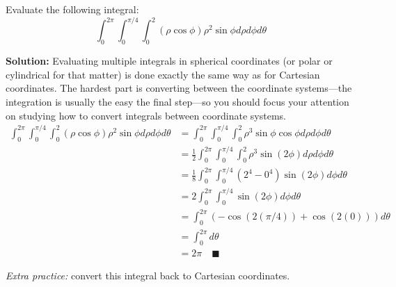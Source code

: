 \documentclass[letterpaper, 11pt]{article}
\begin{document}
\subsection{} Evaluate the following integral:
\[ \int_0^{2\pi} \int_0^{\pi/4} \int_0^2 (\rho \cos \phi) \rho^2 \sin \phi d \rho d \phi d \theta \]
\par \textbf{Solution:} Evaluating multiple integrals in spherical coordinates (or polar or cylindrical for that matter) is done exactly the same way as for Cartesian coordinates. The hardest part is converting between the coordinate systems---the integration is usually the easy the final step---so you should focus your attention on studying how to convert integrals between coordinate systems.
\begin{align*}
\int_0^{2\pi} \int_0^{\pi/4} \int_0^2 (\rho \cos \phi) \rho^2 \sin \phi d \rho d \phi d \theta &= \int_0^{2\pi} \int_0^{\pi/4} \int_0^2 \rho^3 \sin \phi\cos \phi d \rho d \phi d \theta \\
&=\frac{1}{2} \int_0^{2\pi} \int_0^{\pi/4} \int_0^2 \rho^3 \sin (2 \phi) d \rho d \phi d \theta \\
&=\frac{1}{8} \int_0^{2\pi} \int_0^{\pi/4} (2^4 - 0^4) \sin (2 \phi)d \phi d \theta \\
&=2 \int_0^{2\pi} \int_0^{\pi/4} \sin (2 \phi) d \phi d \theta \\
&= \int_0^{2\pi} (-\cos(2 (\pi/4)) + \cos(2(0))) d\theta\\
&= \int_0^{2\pi} d\theta \\
&= 2 \pi \quad\blacksquare
\end{align*}


\par \textit{Extra practice:} convert this integral back to Cartesian coordinates. 
\end{document}
